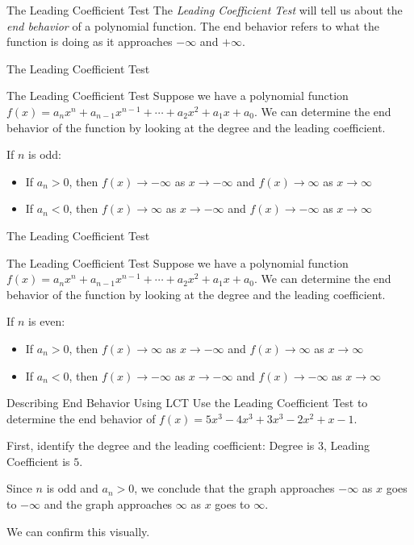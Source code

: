 \documentclass{beamer}
\def\to{\rightarrow}
\begin{document}
\begin{frame}[t]{The Leading Coefficient Test}
The \textit{Leading Coefficient Test} will tell us about the \textit{end behavior} of a polynomial function. \pause The end behavior refers to what the function is doing as it approaches $-\infty$ and $+\infty$.
\end{frame}

\begin{frame}[t]{The Leading Coefficient Test}
\begin{block}{The Leading Coefficient Test}
Suppose we have a polynomial function $f(x) = a_nx^n + a_{n-1}x^{n-1} + \cdots + a_2x^2 + a_1x + a_0$. We can determine the end behavior of the function by looking at the degree and the leading coefficient. \vspace{12pt}

If $n$ is odd: \begin{itemize}
\item If $a_n > 0$, then $f(x) \to -\infty$ as $x \to -\infty$ and $f(x) \to \infty$ as $x \to \infty$
\item If $a_n < 0$, then $f(x) \to \infty$ as $x \to -\infty$ and $f(x) \to -\infty$ as $x \to \infty$
\end{itemize}
\end{block}
\end{frame}

\begin{frame}[t]{The Leading Coefficient Test}
\begin{block}{The Leading Coefficient Test}
Suppose we have a polynomial function $f(x) = a_nx^n + a_{n-1}x^{n-1} + \cdots + a_2x^2 + a_1x + a_0$. We can determine the end behavior of the function by looking at the degree and the leading coefficient. \vspace{12pt}

If $n$ is even: \begin{itemize}
\item If $a_n > 0$, then $f(x) \to \infty$ as $x \to -\infty$ and $f(x) \to \infty$ as $x \to \infty$
\item If $a_n < 0$, then $f(x) \to -\infty$ as $x \to -\infty$ and $f(x) \to -\infty$ as $x \to \infty$
\end{itemize}
\end{block}
\end{frame}

\begin{frame}[t]{Describing End Behavior Using LCT}
Use the Leading Coefficient Test to determine the end behavior of $f(x) = 5x^3 - 4x^3 + 3x^3 - 2x^2 + x - 1$.

\pause

First, identify the degree and the leading coefficient: Degree is $3$, Leading Coefficient is $5$.

\pause Since $n$ is odd and $a_n > 0$, we conclude that the graph approaches $-\infty$ as $x$ goes to $-\infty$ and the graph approaches $\infty$ as $x$ goes to $\infty$.

\pause

We can confirm this visually.
\end{frame}
\end{document}
